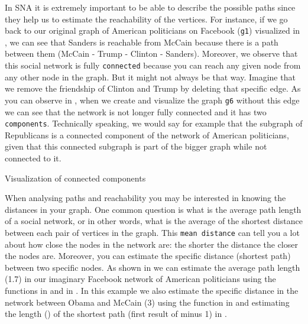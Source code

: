 In SNA it is extremely important to be able to describe the possible paths since they help us to estimate the reachability of the vertices. For instance, if we go back to our original graph of American politicians on Facebook (\texttt{g1}) visualized in , we can see that Sanders is reachable from McCain because there is a path between them (McCain - Trump - Clinton - Sanders).  Moreover, we observe that this social network is fully \texttt{connected} because you can reach any given node from any other node in the graph. But it might not always be that way. Imagine that we remove the friendship of Clinton and Trump by deleting that specific edge. As you can observe in , when we create and visualize the graph \texttt{g6} without this edge we can see that the network is not longer fully connected and it has two \texttt{components}. Technically speaking, we would say for example that the subgraph of Republicans is a connected component of the network of American politicians, given that this connected subgraph is part of the bigger graph while not connected to it.

\begin{ccsexample}
  \caption{Visualization of connected components}
  \label{ex:component}
\end{ccsexample}

When analysing paths and reachability you may be interested in knowing the distances in your graph. One common question is what is the average path length of a social network, or in other words, what is the average of the shortest distance between each pair of vertices in the graph. This \texttt{mean distance} can tell you a lot about how close the nodes in the network are: the shorter the distance the closer the nodes are. Moreover, you can estimate the specific distance (shortest path) between two specific nodes.  As shown in  we can estimate the average path length (1.7) in our imaginary Facebook network of American politicians using the functions  in  and  in . In this example we also estimate the specific distance in the network between Obama and McCain (3) using the function  in  and estimating the length () of the shortest path (first result of  minus 1) in .


